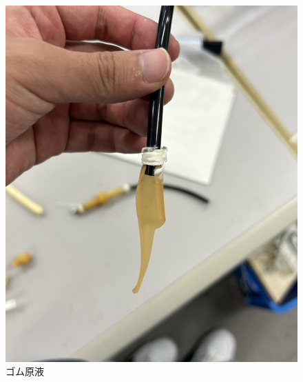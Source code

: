 \begin{figure}[h]
  \centering  %
  \includegraphics[scale=0.2]{pic/5.jpg}
  \caption{ゴム原液}
  \label{fig:gen}
\end{figure}

